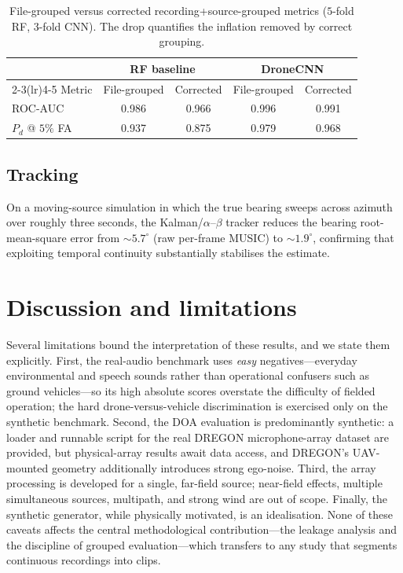 \documentclass[11pt]{article}
\begin{document}
\begin{table}[h]\centering
\caption{File-grouped versus corrected recording+source-grouped metrics
($5$-fold RF, $3$-fold CNN). The drop quantifies the inflation removed by correct
grouping.}
\label{tab:leak}
\begin{tabular}{lcccc}
\toprule
 & \multicolumn{2}{c}{RF baseline} & \multicolumn{2}{c}{DroneCNN} \\
\cmidrule(lr){2-3}\cmidrule(lr){4-5}
Metric & File-grouped & Corrected & File-grouped & Corrected \\
\midrule
ROC-AUC       & 0.986 & 0.966 & 0.996 & 0.991 \\
$P_d$ @ $5\%$ FA & 0.937 & 0.875 & 0.979 & 0.968 \\
\bottomrule
\end{tabular}
\end{table}

\subsection{Tracking}
On a moving-source simulation in which the true bearing sweeps across azimuth over
roughly three seconds, the Kalman/$\alpha$--$\beta$ tracker reduces the bearing
root-mean-square error from $\sim5.7^\circ$ (raw per-frame MUSIC) to
$\sim1.9^\circ$, confirming that exploiting temporal continuity substantially
stabilises the estimate.

\section{Discussion and limitations}
\label{sec:discuss}
Several limitations bound the interpretation of these results, and we state them
explicitly. First, the real-audio benchmark uses \emph{easy} negatives---everyday
environmental and speech sounds rather than operational confusers such as ground
vehicles---so its high absolute scores overstate the difficulty of fielded
operation; the hard drone-versus-vehicle discrimination is exercised only on the
synthetic benchmark. Second, the DOA evaluation is predominantly synthetic: a
loader and runnable script for the real DREGON microphone-array dataset are
provided, but physical-array results await data access, and DREGON's UAV-mounted
geometry additionally introduces strong ego-noise. Third, the array processing is
developed for a single, far-field source; near-field effects, multiple
simultaneous sources, multipath, and strong wind are out of scope. Finally, the
synthetic generator, while physically motivated, is an idealisation. None of
these caveats affects the central methodological contribution---the leakage
analysis and the discipline of grouped evaluation---which transfers to any
study that segments continuous recordings into clips.
\end{document}
